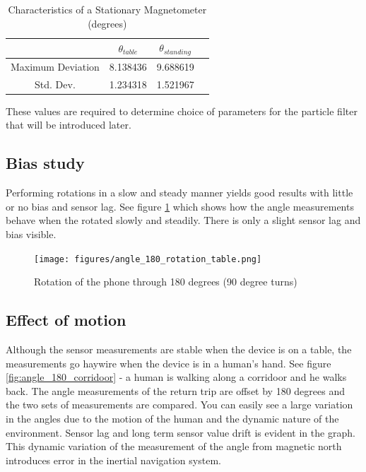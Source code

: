 \begin{table}
\centering
\begin{tabular}{c c c c}
\hline
\hline
 & $\theta_{table}$ & $\theta_{standing}$ \\
\hline
Maximum Deviation & 8.138436 & 9.688619 \\
Std. Dev. & 1.234318 & 1.521967 \\
\hline
\end{tabular}
\caption{Characteristics of a Stationary Magnetometer (degrees)\label{tbl:angle_chars}}
\end{table}

These values are required to determine choice of parameters for the particle
filter that will be introduced later.

\subsection{Bias study}

Performing rotations in a slow and steady manner yields good results with little
or no bias and sensor lag. See figure \ref{fig:angle_180_rotation_table} which 
shows how the angle measurements behave when the rotated slowly and steadily.
There is only a slight sensor lag and bias visible.

\begin{figure}\centering
    \texttt{[image: figures/angle\_180\_rotation\_table.png]}
    \caption{Rotation of the phone through 180 degrees (90 degree turns)\label{fig:angle_180_rotation_table}}
\end{figure}


\subsection{Effect of motion}

Although the sensor measurements are stable when the device is on a table,
the measurements go haywire when the device is in a human's hand. See figure
\ref{fig:angle_180_corridoor} - a human is walking along a corridoor and he walks
back. The angle measurements of the return trip are offset by 180 degrees and
the two sets of measurements are compared. You can easily see a large variation
in the angles due to the motion of the human and the dynamic nature of the environment.
Sensor lag and long term sensor value drift is evident in the graph.
This dynamic variation of the measurement of the angle from magnetic north 
introduces error in the inertial navigation system.

